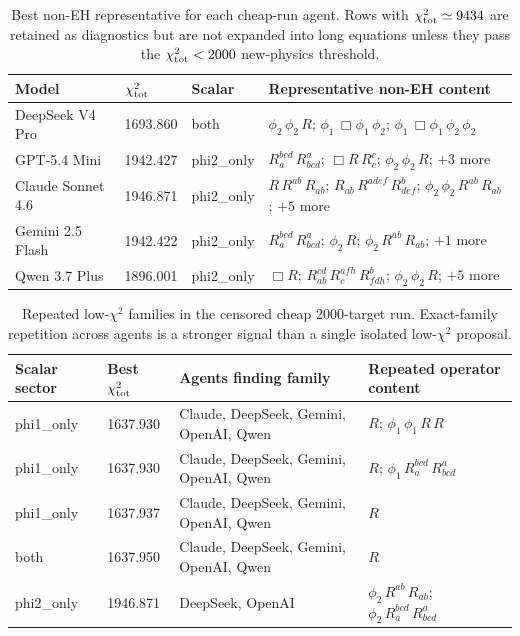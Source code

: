 \documentclass[aps,prd,twocolumn,superscriptaddress,nofootinbib,longbibliography]{revtex4-2}
\newcommand{\chiT}{\chi^2_{\rm tot}}
\begin{document}
\begin{table}[t]
\centering
\scriptsize
\begin{ruledtabular}
\begin{tabular}{llll}
Model & $\chiT$ & Scalar & Representative non-EH content\\
\hline
DeepSeek V4 Pro & 1693.860 & both & $\phi_2 \, \phi_2 \, R$; $\phi_1 \, \Box \phi_1 \, \phi_2$; $\phi_1 \, \Box \phi_1 \, \phi_2 \, \phi_2$ \\
GPT-5.4 Mini & 1942.427 & phi2\_only & $R^{bcd}_{a} \, R^{a}_{bcd}$; $\Box R \, R^{c}_{c}$; $\phi_2 \, \phi_2 \, R$; $+3$ more \\
Claude Sonnet 4.6 & 1946.871 & phi2\_only & $R \, R^{ab} \, R_{ab}$; $R_{ab} \, R^{adef} \, R^{b}_{def}$; $\phi_2 \, \phi_2 \, R^{ab} \, R_{ab}$; $+5$ more \\
Gemini 2.5 Flash & 1942.422 & phi2\_only & $R^{bcd}_{a} \, R^{a}_{bcd}$; $\phi_2 \, R$; $\phi_2 \, R^{ab} \, R_{ab}$; $+1$ more \\
Qwen 3.7 Plus & 1896.001 & phi2\_only & $\Box R$; $R^{cd}_{ab} \, R^{afh}_{c} \, R^{b}_{fdh}$; $\phi_2 \, \phi_2 \, R$; $+5$ more \\
\end{tabular}
\end{ruledtabular}
\caption{Best non-EH representative for each cheap-run agent.  Rows with $\chiT\simeq9434$ are retained as diagnostics but are not expanded into long equations unless they pass the $\chiT<2000$ new-physics threshold.}
\label{tab:appendix-noneh-best}
\end{table}

\begin{table}[t]
\centering
\scriptsize
\begin{ruledtabular}
\begin{tabular}{llll}
Scalar sector & Best $\chiT$ & Agents finding family & Repeated operator content\\
\hline
phi1\_only & 1637.930 & Claude, DeepSeek, Gemini, OpenAI, Qwen & $R$; $\phi_1 \, \phi_1 \, R \, R$ \\
phi1\_only & 1637.930 & Claude, DeepSeek, Gemini, OpenAI, Qwen & $R$; $\phi_1 \, R^{bcd}_{a} \, R^{a}_{bcd}$ \\
phi1\_only & 1637.937 & Claude, DeepSeek, Gemini, OpenAI, Qwen & $R$ \\
both & 1637.950 & Claude, DeepSeek, Gemini, OpenAI, Qwen & $R$ \\
phi2\_only & 1946.871 & DeepSeek, OpenAI & $\phi_2 \, R^{ab} \, R_{ab}$; $\phi_2 \, R^{bcd}_{a} \, R^{a}_{bcd}$ \\
\end{tabular}
\end{ruledtabular}
\caption{Repeated low-$\chi^2$ families in the censored cheap 2000-target run.  Exact-family repetition across agents is a stronger signal than a single isolated low-$\chi^2$ proposal.}
\label{tab:appendix-repeated}
\end{table}
\end{document}
